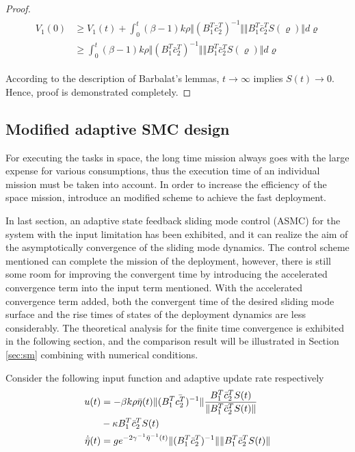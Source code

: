 \documentclass[3p]{elsarticle}
\theoremstyle{plain}
\begin{document}
\begin{proof}
\begin{align}
\begin{split}
V_1(0) &\ge V_1(t) + \int_{0}^{t}(\beta-1)k\rho\Vert(B_1^T\bar{c}^T_2)^{-1}\Vert \Vert B^T_1\bar{c}_2^TS(\varrho)\Vert d\varrho\\
&\ge \int_{0}^{t}(\beta-1)k\rho\Vert(B_1^T\bar{c}^T_2)^{-1}\Vert \Vert B^T_1\bar{c}_2^TS(\varrho)\Vert d\varrho\label{eq:V10}
\end{split}
\end{align}\par
According to the description of Barbalat's lemmas, $t\to\infty$ implies $S(t)\to 0$. Hence, proof is demonstrated completely.
\end{proof}
\subsection{Modified adaptive SMC design}
For executing the tasks in space, the long time mission always goes with the large expense for various consumptions, thus the execution time of an individual mission must be taken into account. In order to increase the efficiency of the space mission, introduce an modified scheme to achieve the fast deployment.\par
In last section, an adaptive state feedback sliding mode control (ASMC) for the system with the input limitation has been exhibited, and it can realize the aim of the asymptotically convergence of the sliding mode dynamics. The control scheme mentioned can complete the mission of the deployment, however, there is still some room for improving the convergent time by introducing the accelerated convergence term into the input term mentioned. With the accelerated convergence term added, both the convergent time of the desired sliding mode surface and the rise times of states of the deployment dynamics are less considerably. The theoretical analysis for the finite time convergence is exhibited in the following section, and the comparison result will be illustrated in Section \ref{sec:sm} combining with numerical conditions.\par
Consider the following input function and adaptive update rate respectively
\begin{align}
u(t) &= - \beta k\rho\bar{\eta}(t)\Vert(B_1^T\bar{c_2^T})^{-1}\Vert\frac{B_1^T\bar{c}_2^TS(t)}{\Vert B_1^T\bar{c}_2^TS(t)\Vert}\notag\\
&-\kappa B_1^T\bar{c}_2^TS(t)\label{eq:ut2}\\
\dot{\bar{\eta}}(t) &= ge^{-2\gamma^{-1}\bar{\eta}^{-1}(t)}\Vert(B_1^T\bar{c}^T_2)^{-1}\Vert \Vert B^T_1\bar{c}_2^TS(t)\Vert
\end{align}
\end{document}
